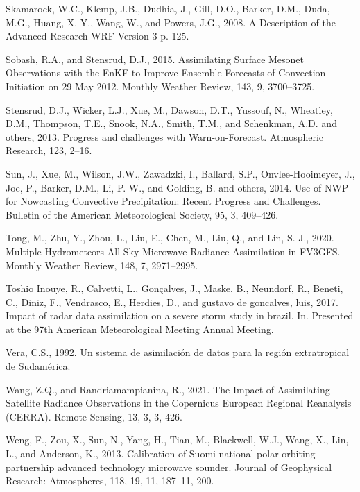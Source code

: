 \documentclass[12pt,oneside,a4paper]{reedthesis}
\begin{document}
\leavevmode\hypertarget{ref-skamarock2008}{}%
Skamarock, W.C., Klemp, J.B., Dudhia, J., Gill, D.O., Barker, D.M., Duda, M.G., Huang, X.-Y., Wang, W., and Powers, J.G., 2008. A Description of the Advanced Research WRF Version 3 p. 125.

\leavevmode\hypertarget{ref-sobash2015}{}%
Sobash, R.A., and Stensrud, D.J., 2015. Assimilating Surface Mesonet Observations with the EnKF to Improve Ensemble Forecasts of Convection Initiation on 29 May 2012. Monthly Weather Review, 143, 9, 3700--3725.

\leavevmode\hypertarget{ref-stensrud2013}{}%
Stensrud, D.J., Wicker, L.J., Xue, M., Dawson, D.T., Yussouf, N., Wheatley, D.M., Thompson, T.E., Snook, N.A., Smith, T.M., and Schenkman, A.D. and others, 2013. Progress and challenges with Warn-on-Forecast. Atmospheric Research, 123, 2--16.

\leavevmode\hypertarget{ref-sun2014}{}%
Sun, J., Xue, M., Wilson, J.W., Zawadzki, I., Ballard, S.P., Onvlee-Hooimeyer, J., Joe, P., Barker, D.M., Li, P.-W., and Golding, B. and others, 2014. Use of NWP for Nowcasting Convective Precipitation: Recent Progress and Challenges. Bulletin of the American Meteorological Society, 95, 3, 409--426.

\leavevmode\hypertarget{ref-tong2020}{}%
Tong, M., Zhu, Y., Zhou, L., Liu, E., Chen, M., Liu, Q., and Lin, S.-J., 2020. Multiple Hydrometeors All-Sky Microwave Radiance Assimilation in FV3GFS. Monthly Weather Review, 148, 7, 2971--2995.

\leavevmode\hypertarget{ref-toshioinouye2017}{}%
Toshio Inouye, R., Calvetti, L., Gonçalves, J., Maske, B., Neundorf, R., Beneti, C., Diniz, F., Vendrasco, E., Herdies, D., and gustavo de goncalves, luis, 2017. Impact of radar data assimilation on a severe storm study in brazil. In. Presented at the 97th American Meteorological Meeting Annual Meeting.

\leavevmode\hypertarget{ref-vera1992}{}%
Vera, C.S., 1992. Un sistema de asimilación de datos para la región extratropical de Sudamérica.

\leavevmode\hypertarget{ref-wang2021}{}%
Wang, Z.Q., and Randriamampianina, R., 2021. The Impact of Assimilating Satellite Radiance Observations in the Copernicus European Regional Reanalysis (CERRA). Remote Sensing, 13, 3, 3, 426.

\leavevmode\hypertarget{ref-weng2013}{}%
Weng, F., Zou, X., Sun, N., Yang, H., Tian, M., Blackwell, W.J., Wang, X., Lin, L., and Anderson, K., 2013. Calibration of Suomi national polar-orbiting partnership advanced technology microwave sounder. Journal of Geophysical Research: Atmospheres, 118, 19, 11, 187--11, 200.
\end{document}
